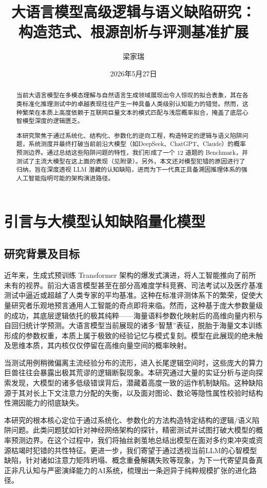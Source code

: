 \documentclass[12pt, a4paper]{report}
\title{\textbf{大语言模型高级逻辑与语义缺陷研究：\\构造范式、根源剖析与评测基准扩展}}
\author{梁家瑞}
\date{2026年5月27日}
\begin{document}
\maketitle

\begin{abstract}

当前大语言模型在多模态理解与自然语言生成领域展现出令人惊叹的拟合表象，其在各类标准化推理测试中的卓越表现往往产生一种具备人类级别认知能力的错觉。然而，这种繁荣在本质上高度依赖于互联网巨量文本的模式匹配与浅层概率拟合，掩盖了底层心智模型深度的逻辑匮乏。

本研究聚焦于通过系统化、结构化、参数化的逆向工程，构造特定的逻辑与语义陷阱问题，系统测度并最终打破当前前沿大模型（如DeepSeek、ChatGPT、Claude）的概率预测边界。通过总结这些陷阱问题的特性，我们形成了一个 12 道题的 Benchmark，并测试了主流大模型在这上面的表现（见附录）。另外，本文还对模型犯错的原因进行了归纳，旨在深度透视 LLM 潜藏的认知缺陷，进而为下一代真正具备溯因推理体系的强人工智能指明可能的架构演进路径。
\end{abstract}

\tableofcontents
\newpage

\chapter{引言与大模型认知缺陷量化模型}

\section{研究背景及目标}

近年来，生成式预训练 Transformer 架构的爆发式演进，将人工智能推向了前所未有的视界。前沿大语言模型甚至在部分高难度学科竞赛、司法考试以及医疗基准测试中逼近或超越了人类专家的平均基准。这种在标准评测体系下的繁荣，促使大量研究者乐观地预言通用人工智能的奇点即将来临。然而，这种基于庞大参数量级的成功，其底层逻辑依托的极其纯粹——海量语料参数化映射后的高维向量内积与自回归统计学预测。大语言模型当前展现的诸多“智慧”表征，脱胎于海量文本训练形成的参数权重，本质上属于极致的经验记忆与模式复刻。模型在此展现的绝未触及思维本质，其内核仅仅停留在高维向量空间的概率映射。

当测试用例稍微偏离主流经验分布的流形，进入长尾逻辑空间时，这些庞大的算力巨兽往往会暴露出极其荒谬的逻辑断裂现象。本研究通过大量的实证分析与逆向探索发现，大模型的诸多低级错误背后，潜藏着高度一致的运作机制缺陷。这种缺陷源于其对长上下文注意力分配的失衡，以及面对图论、数论等隐性属性校验时结构性溯因能力的彻底缺失。

本研究的根本核心定位于通过系统化、参数化的方法构造特定结构的逻辑/语义陷阱问题。此类问题犹如针对神经网络架构的探针，精密测试并试图打破大模型的概率预测边界。在这个过程中，我们将抽丝剥茧地总结出模型在面对多约束冲突或资源枯竭时犯错的共性特征。更进一步，我们寄望于通过透视当前LLM的心智模型缺陷，针对诸如注意力矩阵坍塌、概念重叠解耦失败等现象，为下一代寄望具备真正非凡认知与严密演绎能力的AI系统，梳理出一条迥异于纯粹规模扩张的进化路径。
\end{document}
